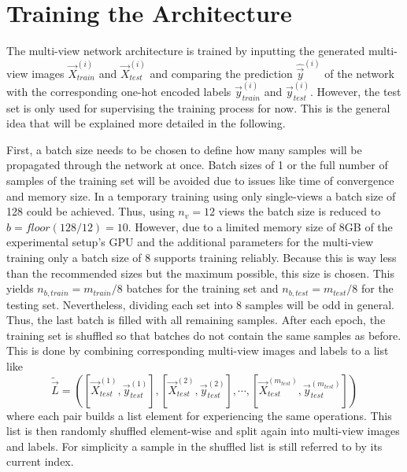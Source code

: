 \section{Training the Architecture}
\label{sec:methods-training}
The multi-view network architecture is trained by inputting the generated multi-view images $\vec{X}_{train}^{(i)}$ and $\vec{X}_{test}^{(i)}$ and comparing the prediction $\hat{\vec{y}}^{(i)}$ of the network with the corresponding one-hot encoded labels $\vec{y}_{train}^{(i)}$ and $\vec{y}_{test}^{(i)}$.
However, the test set is only used for supervising the training process for now.
This is the general idea that will be explained more detailed in the following.

First, a batch size needs to be chosen to define how many samples will be propagated through the network at once.
Batch sizes of 1 or the full number of samples of the training set will be avoided due to issues like time of convergence and memory size.
In a temporary training using only single-views a batch size of 128 could be achieved.
Thus, using $n_v = 12$ views the batch size is reduced to $b = floor(128 / 12) = 10$.
However, due to a limited memory size of 8GB of the experimental setup's GPU and the additional parameters for the multi-view training only a batch size of 8 supports training reliably.
Because this is way less than the recommended sizes but the maximum possible, this size is chosen.
This yields $n_{b,train} = m_{train} / 8$ batches for the training set and $n_{b,test} = m_{test} / 8$ for the testing set.
Nevertheless, dividing each set into 8 samples will be odd in general.
Thus, the last batch is filled with all remaining samples.
After each epoch, the training set is shuffled so that batches do not contain the same samples as before.
This is done by combining corresponding multi-view images and labels to a list like
\begin{equation}
\tilde{\vec{L}} = \left( \left[ \vec{X}_{test}^{(1)}, \vec{y}_{test}^{(1)} \right], \left[ \vec{X}_{test}^{(2)}, \vec{y}_{test}^{(2)} \right], \cdots , \left[ \vec{X}_{test}^{(m_{test})}, \vec{y}_{test}^{(m_{test})} \right] \right)
\end{equation}
where each pair builds a list element for experiencing the same operations.
This list is then randomly shuffled element-wise and split again into multi-view images and labels.
For simplicity a sample in the shuffled list is still referred to by its current index.


